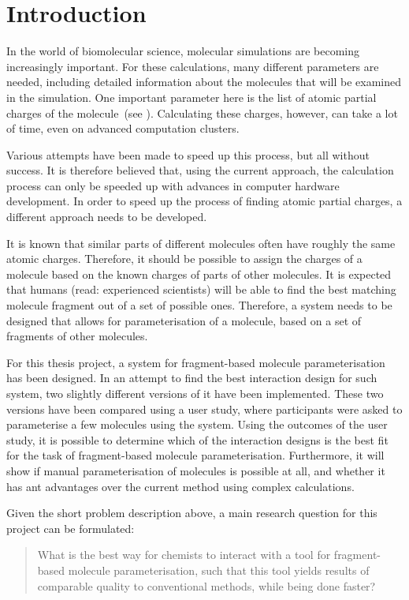 \chapter{Introduction}

In the world of biomolecular science, molecular simulations are becoming increasingly important. For these calculations, many different parameters are needed, including detailed information about the molecules that will be examined in the simulation. One important parameter here is the list of atomic partial charges of the molecule~(see ). Calculating these charges, however, can take a lot of time, even on advanced computation clusters.

Various attempts have been made to speed up this process, but all without success. It is therefore believed that, using the current approach, the calculation process can only be speeded up with advances in computer hardware development. In order to speed up the process of finding atomic partial charges, a different approach needs to be developed.

It is known that similar parts of different molecules often have roughly the same atomic charges. Therefore, it should be possible to assign the charges of a molecule based on the known charges of parts of other molecules. It is expected that humans (read: experienced scientists) will be able to find the best matching molecule fragment out of a set of possible ones. Therefore, a system needs to be designed that allows for parameterisation of a molecule, based on a set of fragments of other molecules.

For this thesis project, a system for fragment-based molecule parameterisation has been designed. In an attempt to find the best interaction design for such system, two slightly different versions of it have been implemented. These two versions have been compared using a user study, where participants were asked to parameterise a few molecules using the system. Using the outcomes of the user study, it is possible to determine which of the interaction designs is the best fit for the task of fragment-based molecule parameterisation. Furthermore, it will show if manual parameterisation of molecules is possible at all, and whether it has ant advantages over the current method using complex calculations.

Given the short problem description above, a main research question for this project can be formulated:
\begin{quote}
What is the best way for chemists to interact with a tool for fragment-based molecule parameterisation, such that this tool yields results of comparable quality to conventional methods, while being done faster?
\end{quote}
\clearpage

